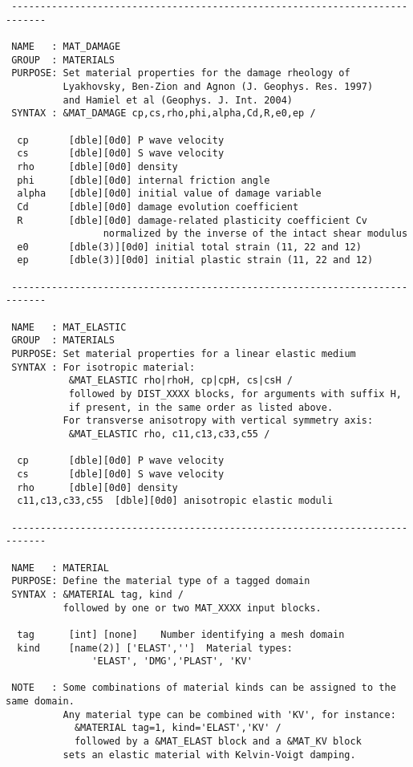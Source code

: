 \begin{verbatim}
 ----------------------------------------------------------------------------

 NAME   : MAT_DAMAGE
 GROUP  : MATERIALS
 PURPOSE: Set material properties for the damage rheology of 
          Lyakhovsky, Ben-Zion and Agnon (J. Geophys. Res. 1997) 
          and Hamiel et al (Geophys. J. Int. 2004)
 SYNTAX : &MAT_DAMAGE cp,cs,rho,phi,alpha,Cd,R,e0,ep /

  cp       [dble][0d0] P wave velocity
  cs       [dble][0d0] S wave velocity
  rho      [dble][0d0] density
  phi      [dble][0d0] internal friction angle
  alpha    [dble][0d0] initial value of damage variable
  Cd       [dble][0d0] damage evolution coefficient
  R        [dble][0d0] damage-related plasticity coefficient Cv
                 normalized by the inverse of the intact shear modulus
  e0       [dble(3)][0d0] initial total strain (11, 22 and 12)
  ep       [dble(3)][0d0] initial plastic strain (11, 22 and 12)

 ----------------------------------------------------------------------------

 NAME   : MAT_ELASTIC
 GROUP  : MATERIALS
 PURPOSE: Set material properties for a linear elastic medium
 SYNTAX : For isotropic material:
           &MAT_ELASTIC rho|rhoH, cp|cpH, cs|csH /
           followed by DIST_XXXX blocks, for arguments with suffix H,
           if present, in the same order as listed above.
          For transverse anisotropy with vertical symmetry axis:
           &MAT_ELASTIC rho, c11,c13,c33,c55 /

  cp       [dble][0d0] P wave velocity
  cs       [dble][0d0] S wave velocity
  rho      [dble][0d0] density
  c11,c13,c33,c55  [dble][0d0] anisotropic elastic moduli 

 ----------------------------------------------------------------------------

 NAME   : MATERIAL
 PURPOSE: Define the material type of a tagged domain
 SYNTAX : &MATERIAL tag, kind /
          followed by one or two MAT_XXXX input blocks.

  tag      [int] [none]    Number identifying a mesh domain 
  kind     [name(2)] ['ELAST','']  Material types:
               'ELAST', 'DMG','PLAST', 'KV' 

 NOTE   : Some combinations of material kinds can be assigned to the same domain.
          Any material type can be combined with 'KV', for instance:
            &MATERIAL tag=1, kind='ELAST','KV' /
            followed by a &MAT_ELAST block and a &MAT_KV block
          sets an elastic material with Kelvin-Voigt damping. 


\end{verbatim}
